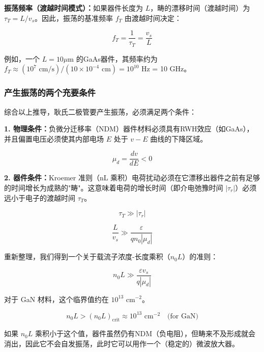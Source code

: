 \documentclass[12pt,a4paper]{article}
\begin{document}
\textbf{振荡频率（渡越时间模式）：}如果器件长度为 $L$，畴的漂移时间（渡越时间）为 $\tau_T = L/v_s$。因此，振荡的基准频率 $f_T$ 由渡越时间决定：

\begin{equation}
    f_T = \frac{1}{\tau_T} = \frac{v_s}{L}
\end{equation}

例如，一个 $L = 10\mu$m 的GaAs器件，其频率约为 $f_T \approx (10^7 \text{ cm/s})/(10 \times 10^{-4} \text{ cm}) = 10^{10}$ Hz = 10 GHz。

\subsubsection{产生振荡的两个充要条件}

综合以上推导，耿氏二极管要产生振荡，必须满足两个条件：

\textbf{1. 物理条件：}负微分迁移率（NDM）器件材料必须具有RWH效应（如GaAs），并且偏置电压必须使其内部电场 $E$ 处于 $v - E$ 曲线的下降区域。

\begin{equation}
    \mu_d = \frac{dv}{dE} < 0
\end{equation}

\textbf{2. 器件条件：}Kroemer 准则（nL 乘积）电荷扰动必须在它漂移出器件之前有足够的时间增长为成熟的"畴"。这意味着电荷的增长时间（即介电弛豫时间 $|\tau_r|$）必须远小于电子的渡越时间 $\tau_T$。

\begin{equation}
    \tau_T \gg |\tau_r|
\end{equation}

\begin{equation}
    \frac{L}{v_s} \gg \frac{\varepsilon}{qn_0|\mu_d|}
\end{equation}

重新整理，我们得到一个关于载流子浓度-长度乘积（$n_0L$）的准则：

\begin{equation}
    n_0L \gg \frac{\varepsilon v_s}{q|\mu_d|}
\end{equation}

对于 GaN 材料，这个临界值约在 $10^{13}$ cm$^{-2}$。


\begin{equation}
    n_0L > (n_0L)_{\text{crit}} \approx 10^{13} \text{ cm}^{-2} \quad \text{(for GaN)}
\end{equation}

如果 $n_0L$ 乘积小于这个值，器件虽然仍有NDM（负电阻），但畴来不及形成就会消出，因此它不会自发振荡，此时它可以用作一个（稳定的）微波放大器。
\end{document}
